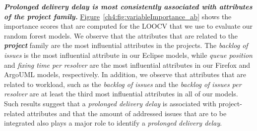 \noindent\textit{\textbf{{Prolonged delivery delay is most consistently associated with
attributes of the project family.}}}
\hyperref[ch4:fig:variableImportance_ab]{Figure}~\ref{ch4:fig:variableImportance_ab}
shows the importance scores that are computed for the LOOCV that we use to
evaluate our random forest models. We observe that the attributes that are
related to the \textit{\textbf{project}} family are the most influential
attributes in the projects. The \textit{backlog of issues} is the most
influential attribute in our Eclipse models, while \textit{queue position} and
\textit{fixing time per resolver} are the most influential attributes in our
Firefox and ArgoUML models, respectively. In addition, we observe that
attributes that are related to workload, such as the \textit{backlog of issues}
and the \textit{backlog of issues per resolver} are at least the third most
influential attributes in all of our models. Such results suggest that a
\textit{prolonged delivery delay} is associated with project-related attributes and
that the amount of addressed issues that are to be integrated also plays a major
role to identify a \textit{prolonged delivery delay}. \\


